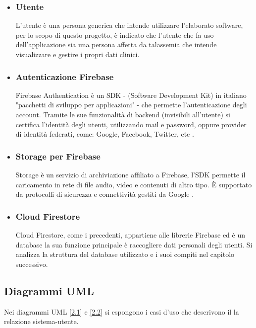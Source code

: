\documentclass[12pt,a4paper,openright,twoside]{report}
\begin{document}
\begin{itemize}
    \item \subsubsection{Utente}
    L'utente è una persona generica che intende utilizzare l'elaborato software, per lo scopo di questo progetto, è indicato che l'utente che fa uso dell'applicazione sia una persona affetta da talassemia che intende visualizzare e gestire i propri dati clinici.
    
    \item \subsubsection{Autenticazione Firebase}
    Firebase Authentication è un SDK - (Software Development Kit) in italiano "pacchetti di sviluppo per applicazioni" - che permette l'autenticazione degli account. Tramite le sue funzionalità di backend (invisibili all'utente) si certifica l'identità degli utenti, utilizzando mail e password, oppure provider di identità federati, come: Google, Facebook, Twitter, etc \cite{firebaseAuth}.

    \item \subsubsection{Storage per Firebase}
    Storage è un servizio di archiviazione affiliato a Firebase, l'SDK permette il caricamento in rete di file audio, video e contenuti di altro tipo. \`E supportato da protocolli di sicurezza e connettività gestiti da Google \cite{firebaseStorage}.
    
    \item \subsubsection{Cloud Firestore }
    Cloud Firestore, come i precedenti, appartiene alle librerie Firebase ed è un database la sua funzione principale è raccogliere dati personali degli utenti.  Si analizza la struttura del database utilizzato e i suoi compiti nel capitolo successivo.  
\end{itemize}

\subsection{Diagrammi UML}
Nei diagrammi UML \ref{2.1} e \ref{2.2} si espongono i casi d'uso che descrivono il la relazione sistema-utente.
\end{document}

